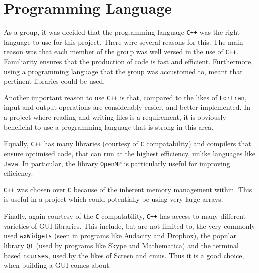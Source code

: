 \section{Programming Language}

As a group, it was decided that the programming language \texttt{C++} was the right language to use for this project.
There were several reasons for this.
The main reason was that each member of the group was well versed in the use of \texttt{C++}.
Familiarity ensures that the production of code is fast and efficient.
Furthermore, using a programming language that the group was accustomed to, meant that pertinent libraries could be used.

Another important reason to use \texttt{C++} is that, compared to the likes of \texttt{Fortran}, input and output operations are considerably easier, and better implemented.
In a project where reading and writing files is a requirement, it is obviously beneficial to use a programming language that is strong in this area.

Equally, \texttt{C++} has many libraries (courtesy of \texttt{C} compatability) and compilers that ensure optimised code, that can run at the highest efficiency, unlike languages like \texttt{Java}.
In particular, the library \texttt{OpenMP} is particularly useful for improving efficiency.

\texttt{C++} was chosen over \texttt{C} because of the inherent memory management within.
This is useful in a project which could potentially be using very large arrays.

Finally, again courtesy of the \texttt{C} compatability, \texttt{C++} has access to many different varieties of GUI libraries.
This include, but are not limited to, the very commonly used \texttt{wxWidgets} (seen in programs like Audacity and Dropbox), the popular library \texttt{Qt} (used by programs like Skype and Mathematica) and the terminal based \texttt{ncurses}, used by the likes of Screen and cmus.
Thus it is a good choice, when building a GUI comes about.
